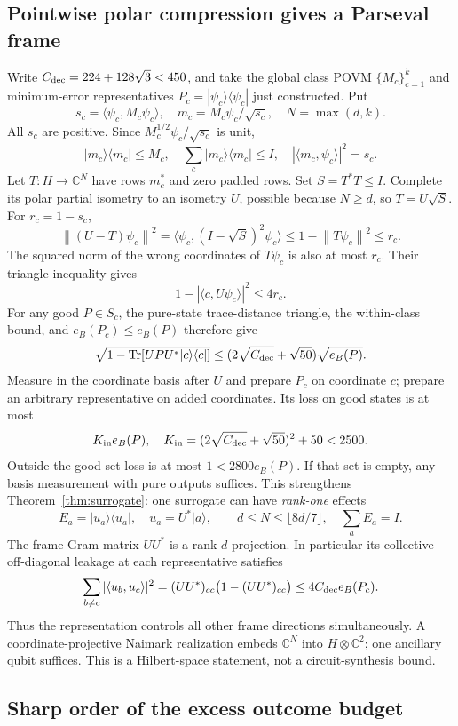 \documentclass[11pt]{article}
\newcommand{\Tr}{\operatorname{Tr}}
\newcommand{\norm}[1]{\left\lVert#1\right\rVert}
\begin{document}
\subsection{Pointwise polar compression gives a Parseval frame}

Write $C_{\rm dec}=224+128\sqrt3<450$, and take the global class POVM $\{M_c\}_{c=1}^k$ and minimum-error representatives $P_c=|\psi_c\rangle\langle\psi_c|$ just constructed. Put
\[
s_c=\langle\psi_c,M_c\psi_c\rangle,\quad
m_c=M_c\psi_c/\sqrt{s_c},\quad N=\max(d,k).
\]
All $s_c$ are positive. Since $M_c^{1/2}\psi_c/\sqrt{s_c}$ is unit,
\[
|m_c\rangle\langle m_c|\le M_c,\quad
\sum_c|m_c\rangle\langle m_c|\le I,\quad
|\langle m_c,\psi_c\rangle|^2=s_c.
\]
Let $T:H\to\mathbb C^N$ have rows $m_c^*$ and zero padded rows. Set $S=T^*T\le I$. Complete its polar partial isometry to an isometry $U$, possible because $N\ge d$, so $T=U\sqrt S$. For $r_c=1-s_c$,
\[
\norm{(U-T)\psi_c}^2
=\langle\psi_c,(I-\sqrt S)^2\psi_c\rangle
\le1-\norm{T\psi_c}^2\le r_c.
\]
The squared norm of the wrong coordinates of $T\psi_c$ is also at most $r_c$. Their triangle inequality gives
\[
1-|\langle c,U\psi_c\rangle|^2\le4r_c.
\]
For any good $P\in S_c$, the pure-state trace-distance triangle, the within-class bound, and $e_B(P_c)\le e_B(P)$ therefore give
\[
\sqrt{1-\Tr[UPU^*|c\rangle\langle c|]}
\le(2\sqrt{C_{\rm dec}}+\sqrt{50})\sqrt{e_B(P)}.
\]
Measure in the coordinate basis after $U$ and prepare $P_c$ on coordinate $c$; prepare an arbitrary representative on added coordinates. Its loss on good states is at most
\[
K_{\rm in}e_B(P),\quad
K_{\rm in}=(2\sqrt{C_{\rm dec}}+\sqrt{50})^2+50<2500.
\]
Outside the good set loss is at most $1<2800e_B(P)$. If that set is empty, any basis measurement with pure outputs suffices. This strengthens Theorem~\ref{thm:surrogate}: one surrogate can have \emph{rank-one} effects
\[
E_a=|u_a\rangle\langle u_a|,\quad u_a=U^*|a\rangle,
\qquad d\le N\le\lfloor8d/7\rfloor,\quad \sum_aE_a=I.
\]
The frame Gram matrix $UU^*$ is a rank-$d$ projection. In particular its collective off-diagonal leakage at each representative satisfies
\[
\sum_{b\ne c}|\langle u_b,u_c\rangle|^2
=(UU^*)_{cc}\bigl(1-(UU^*)_{cc}\bigr)
\le4C_{\rm dec}e_B(P_c).
\]
Thus the representation controls all other frame directions simultaneously. A coordinate-projective Naimark realization embeds $\mathbb C^N$ into $H\otimes\mathbb C^2$; one ancillary qubit suffices. This is a Hilbert-space statement, not a circuit-synthesis bound.

\subsection{Sharp order of the excess outcome budget}
\end{document}
